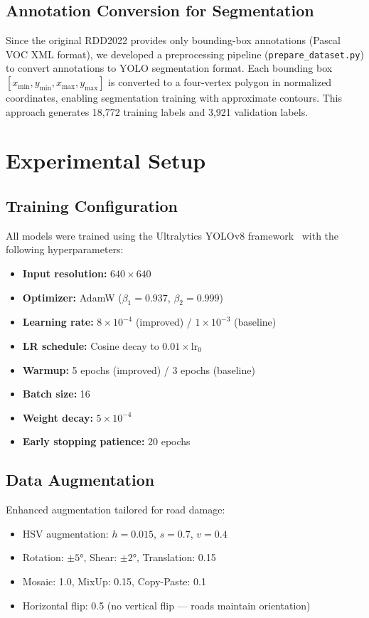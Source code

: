 \documentclass[conference]{IEEEtran}
\begin{document}
\subsection{Annotation Conversion for Segmentation}
Since the original RDD2022 provides only bounding-box annotations (Pascal VOC XML format), we developed a preprocessing pipeline (\texttt{prepare\_dataset.py}) to convert annotations to YOLO segmentation format. Each bounding box $[x_{\min}, y_{\min}, x_{\max}, y_{\max}]$ is converted to a four-vertex polygon in normalized coordinates, enabling segmentation training with approximate contours. This approach generates 18,772 training labels and 3,921 validation labels.


\section{Experimental Setup}
\label{sec:experiments}

\subsection{Training Configuration}
All models were trained using the Ultralytics YOLOv8 framework~\cite{jocher2023yolov8} with the following hyperparameters:
\begin{itemize}[leftmargin=*]
    \item \textbf{Input resolution:} $640 \times 640$
    \item \textbf{Optimizer:} AdamW ($\beta_1{=}0.937$, $\beta_2{=}0.999$)
    \item \textbf{Learning rate:} $8 \times 10^{-4}$ (improved) / $1 \times 10^{-3}$ (baseline)
    \item \textbf{LR schedule:} Cosine decay to $0.01 \times \text{lr}_0$
    \item \textbf{Warmup:} 5 epochs (improved) / 3 epochs (baseline)
    \item \textbf{Batch size:} 16
    \item \textbf{Weight decay:} $5 \times 10^{-4}$
    \item \textbf{Early stopping patience:} 20 epochs
\end{itemize}

\subsection{Data Augmentation}
Enhanced augmentation tailored for road damage:
\begin{itemize}[leftmargin=*]
    \item HSV augmentation: $h{=}0.015$, $s{=}0.7$, $v{=}0.4$
    \item Rotation: $\pm5°$, Shear: $\pm2°$, Translation: 0.15
    \item Mosaic: 1.0, MixUp: 0.15, Copy-Paste: 0.1
    \item Horizontal flip: 0.5 (no vertical flip --- roads maintain orientation)
\end{itemize}
\end{document}
